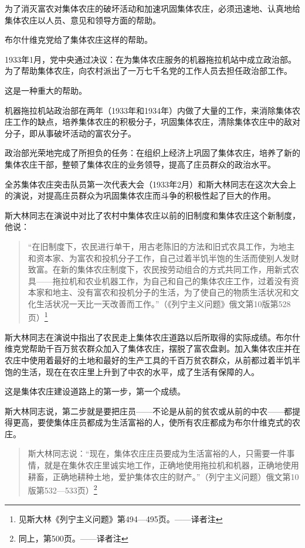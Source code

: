 为了消灭富农对集体农庄的破坏活动和加速巩固集体农庄，必须迅速地、认真地给集体农庄以人员、意见和领导方面的帮助。

布尔什维克党给了集体农庄这样的帮助。

1933年1月，党中央通过决议：在为集体农庄服务的机器拖拉机站中成立政治部。为了帮助集体农庄，向农村派出了一万七千名党的工作人员去担任政治部工作。

这是一种重大的帮助。

机器拖拉机站政治部在两年（1933年和1934年）内做了大量的工作，来消除集体农庄工作的缺点，培养集体农庄的积极分子，巩固集体农庄，清除集体农庄中的敌对分子，即从事破坏活动的富农分子。

政治部光荣地完成了所担负的任务：在组织上经济上巩固了集体农庄，培养了新的集体农庄干部，整顿了集体农庄的业务领导，提高了庄员群众的政治水平。

全苏集体农庄突击队员第一次代表大会（1933年2月）和斯大林同志在这次大会上的演说，对提高庄员群众为巩固集体农庄而斗争的积极性起了巨大的作用。

斯大林同志在演说中对比了农村中集体农庄以前的旧制度和集体农庄这个新制度，他说：

\begin{quotation}
“在旧制度下，农民进行单干，用古老陈旧的方法和旧式农具工作，为地主和资本家、为富农和投机分子工作，自己过着半饥半饱的生活而使别人发财致富。在新的集体农庄制度下，农民按劳动组合的方式共同工作，用新式农具——拖拉机和农业机器工作，为自己和自己的集体农庄工作，过着没有资本家和地主、没有富农和投机分子的生活，为了使自己的物质生活状况和文化生活状况一天比一天改善而工作。”（《列宁主义问题》俄文第10版第528页）\footnote{见斯大林《列宁主义问题》第494—495页。——译者注}
\end{quotation}

斯大林同志在演说中指出了农民走上集体农庄道路以后所取得的实际成绩。布尔什维克党帮助千百万贫农群众加入了集体农庄，摆脱了富农盘剥。加入集体农庄并在农庄中使用着最好的土地和最好的生产工具的千百万贫农群众，从前都过着半饥半饱的生活，现在在农庄里上升到了中农的水平，成了生活有保障的人。

这是集体农庄建设道路上的第一步，第一个成绩。

斯大林同志说，第二步就是要把庄员——不论是从前的贫农或从前的中农——都提得更高，要使集体庄员都成为生活富裕的人，使所有农庄都成为布尔什维克式的农庄。

\begin{quotation}
斯大林同志说：“现在，集体农庄庄员要成为生活富裕的人，只需要一件事情，就是在集休农庄里诚实地工作，正确地使用拖拉机和机器，正确地使用耕畜，正确地耕种土地，爱护集体农庄的财产。”（列宁主义问题）俄文第10版第532—533页）\footnote{同上，第500页。——译者注}
\end{quotation}


